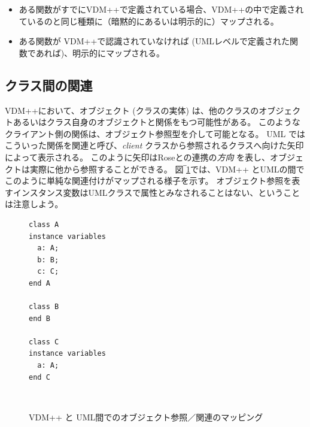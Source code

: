 \documentclass[\pformat,12pt]{jarticle}
\newcommand{\vdmpp}{VDM++}
\newcommand{\link}{Roseとの連携}
\begin{document}
\begin{itemize}
\item ある関数がすでに\vdmpp{}で定義されている場合、\vdmpp{}の中で定義されているのと同じ種類に（暗黙的にあるいは明示的に）マップされる。
\item ある関数が \vdmpp{}で認識されていなければ (UMLレベルで定義された関数であれば)、明示的にマップされる。
\end{itemize}

\subsection{クラス間の関連} \label{assoclasses}
  
 \vdmpp{}において、オブジェクト (クラスの実体) は、他のクラスのオブジェクトあるいはクラス自身のオブジェクトと関係をもつ可能性がある。
このようなクライアント側の関係は、オブジェクト参照型を介して可能となる。
UML ではこういった関係を関連と呼び、{\it client} クラスから参照されるクラスへ向けた矢印によって表示される。
このように矢印は\link{}の{\it 方向} を表し、オブジェクトは実際に他から参照することができる。
図‾\ref{fig:classA}では、\vdmpp{} とUMLの間でこのように単純な関連付けがマップされる様子を示す。
オブジェクト参照を表すインスタンス変数はUMLクラスで属性とみなされることはない、ということは注意しよう。

\begin{figure}[htb]
\begin{center}
\hspace{-2cm}
\begin{minipage}[t]{2in}
\begin{verbatim}
class A  
instance variables  
  a: A;  
  b: B;  
  c: C;  
end A  
  
class B  
end B  
  
class C  
instance variables  
  a: A;  
end C  
\end{verbatim}
\end{minipage} \ \
\begin{minipage}[t]{2in}
\vspace{1cm}
\end{minipage}
\caption{\vdmpp{} と UML間でのオブジェクト参照／関連のマッピング　\label{fig:classA}}
\end{center}
\end{figure}
\end{document}

